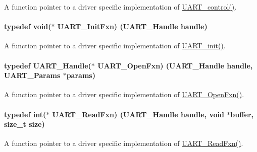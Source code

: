 A function pointer to a driver specific implementation of \hyperlink{_u_a_r_t_8h_a9de3c26cfe4ce6b7f350a6ea6e16801d}{U\+A\+R\+T\+\_\+control()}. 

\paragraph[{U\+A\+R\+T\+\_\+\+Init\+Fxn}]{\setlength{\rightskip}{0pt plus 5cm}typedef void($\ast$ U\+A\+R\+T\+\_\+\+Init\+Fxn) ({\bf U\+A\+R\+T\+\_\+\+Handle} handle)}\label{_u_a_r_t_8h_a2b3e89df3065fffb47e7354067c14d1b}


A function pointer to a driver specific implementation of \hyperlink{_u_a_r_t_8h_ab60a36f7295d704926120d22f806dcd1}{U\+A\+R\+T\+\_\+init()}. 

\paragraph[{U\+A\+R\+T\+\_\+\+Open\+Fxn}]{\setlength{\rightskip}{0pt plus 5cm}typedef {\bf U\+A\+R\+T\+\_\+\+Handle}($\ast$ U\+A\+R\+T\+\_\+\+Open\+Fxn) ({\bf U\+A\+R\+T\+\_\+\+Handle} handle, {\bf U\+A\+R\+T\+\_\+\+Params} $\ast$params)}\label{_u_a_r_t_8h_a39e21ac60f24eb9ce32286e21de713d1}


A function pointer to a driver specific implementation of \hyperlink{_u_a_r_t_8h_a39e21ac60f24eb9ce32286e21de713d1}{U\+A\+R\+T\+\_\+\+Open\+Fxn()}. 

\paragraph[{U\+A\+R\+T\+\_\+\+Read\+Fxn}]{\setlength{\rightskip}{0pt plus 5cm}typedef int($\ast$ U\+A\+R\+T\+\_\+\+Read\+Fxn) ({\bf U\+A\+R\+T\+\_\+\+Handle} handle, void $\ast$buffer, size\+\_\+t size)}\label{_u_a_r_t_8h_a4d855b637a26d787afec822d4cd2978e}


A function pointer to a driver specific implementation of \hyperlink{_u_a_r_t_8h_a4d855b637a26d787afec822d4cd2978e}{U\+A\+R\+T\+\_\+\+Read\+Fxn()}. 

